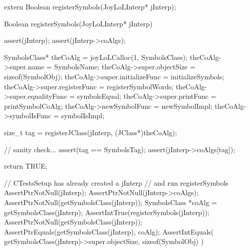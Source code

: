 \startCHeader
extern Boolean registerSymbols(JoyLoLInterp* jInterp);
\stopCHeader
{}

\startCCode
Boolean registerSymbols(JoyLoLInterp* jInterp) {
  assert(jInterp);
  assert(jInterp->coAlgs);
  
  SymbolsClass* theCoAlg = joyLoLCalloc(1, SymbolsClass);
  theCoAlg->super.name           = SymbolsName;
  theCoAlg->super.objectSize     = sizeof(SymbolObj);
  theCoAlg->super.initializeFunc = initializeSymbols;
  theCoAlg->super.registerFunc   = registerSymbolWords;
  theCoAlg->super.equalityFunc   = symbolsEqual;
  theCoAlg->super.printFunc      = printSymbolCoAlg;
  theCoAlg->newSymbolFunc        = newSymbolImpl;
  theCoAlg->symbolIsFunc         = symbolIsImpl;

  size_t tag =
    registerJClass(jInterp, (JClass*)theCoAlg);
  
  // sanity check...
  assert(tag == SymbolsTag);
  assert(jInterp->coAlgs[tag]);

  return TRUE;
}
\stopCCode


\startCTest
  // CTestsSetup has already created a jInterp
  // and run registerSymbols
  AssertPtrNotNull(jInterp);
  AssertPtrNotNull(jInterp->coAlgs);
  AssertPtrNotNull(getSymbolsClass(jInterp));
  SymbolsClass *coAlg = getSymbolsClass(jInterp);
  AssertIntTrue(registerSymbols(jInterp));
  AssertPtrNotNull(getSymbolsClass(jInterp));
  AssertPtrEquals(getSymbolsClass(jInterp), coAlg);
  AssertIntEquals(
    getSymbolsClass(jInterp)->super.objectSize,
    sizeof(SymbolObj)
  )
\stopCTest
\stopTestCase
\stopTestSuite
